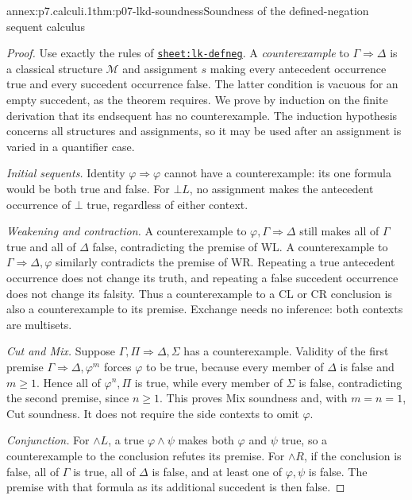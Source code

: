 \begin{annexitem}{annex:p7.calculi.1}{thm:p07-lkd-soundness}{Soundness of the defined-negation sequent calculus}
\begin{proof}
Use exactly the rules of \hyperref[sheet:lk-defneg]{\texttt{sheet:lk-defneg}}.
A \emph{counterexample} to \(\Gamma\Rightarrow\Delta\) is a classical
structure \(\mathcal M\) and assignment \(s\) making every antecedent
occurrence true and every succedent occurrence false.  The latter condition
is vacuous for an empty succedent, as the theorem requires.  We prove by
induction on the finite derivation that its endsequent has no counterexample.
The induction hypothesis concerns all structures and assignments, so it may
be used after an assignment is varied in a quantifier case.

\emph{Initial sequents.} Identity \(\varphi\Rightarrow\varphi\) cannot
have a counterexample: its one formula would be both true and false.
For \(\bot L\), no assignment makes the antecedent occurrence of \(\bot\)
true, regardless of either context.

\emph{Weakening and contraction.} A counterexample to
\(\varphi,\Gamma\Rightarrow\Delta\) still makes all of \(\Gamma\) true
and all of \(\Delta\) false, contradicting the premise of WL.  A
counterexample to \(\Gamma\Rightarrow\Delta,\varphi\) similarly
contradicts the premise of WR.  Repeating a true antecedent occurrence
does not change its truth, and repeating a false succedent occurrence does
not change its falsity.  Thus a counterexample to a CL or CR conclusion is
also a counterexample to its premise.  Exchange needs no inference: both
contexts are multisets.

\emph{Cut and Mix.} Suppose
\(\Gamma,\Pi\Rightarrow\Delta,\Sigma\) has a counterexample.  Validity
of the first premise \(\Gamma\Rightarrow\Delta,\varphi^m\) forces
\(\varphi\) to be true, because every member of \(\Delta\) is false
and \(m\ge1\).  Hence all of \(\varphi^n,\Pi\) is true, while every
member of \(\Sigma\) is false, contradicting the second premise, since
\(n\ge1\).  This proves Mix soundness and, with \(m=n=1\), Cut
soundness.  It does not require the side contexts to omit \(\varphi\).

\emph{Conjunction.} For \(\land L\), a true
\(\varphi\land\psi\) makes both \(\varphi\) and \(\psi\) true, so a
counterexample to the conclusion refutes its premise.  For \(\land R\),
if the conclusion is false, all of \(\Gamma\) is true, all of \(\Delta\)
is false, and at least one of \(\varphi,\psi\) is false.  The premise
with that formula as its additional succedent is then false.


\end{proof}
\end{annexitem}
